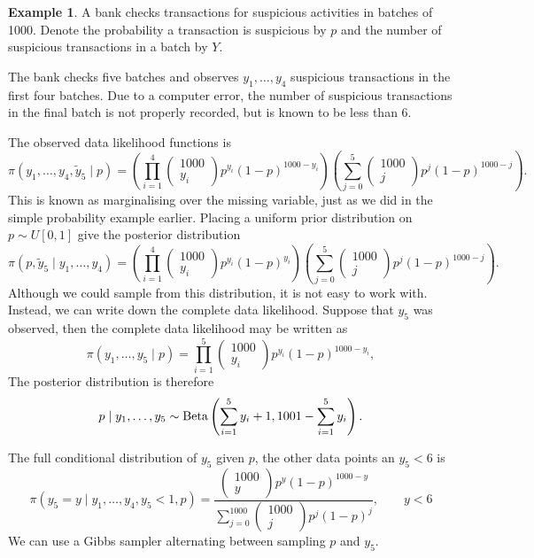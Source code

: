 \documentclass[
]{book}
\theoremstyle{definition}
\theoremstyle{definition}
\newtheorem{example}{Example}[chapter]
\theoremstyle{definition}
\theoremstyle{definition}
\theoremstyle{remark}
\begin{document}
\begin{example}
A bank checks transactions for suspicious activities in batches of 1000. Denote the probability a transaction is suspicious by \(p\) and the number of suspicious transactions in a batch by \(Y\).

The bank checks five batches and observes \(y_1, \ldots, y_4\) suspicious transactions in the first four batches. Due to a computer error, the number of suspicious transactions in the final batch is not properly recorded, but is known to be less than 6.

The observed data likelihood functions is
\[
\pi(y_1, \ldots, y_4, \tilde{y}_5 \mid p) = \left(\prod_{i=1}^4\begin{pmatrix} 1000 \\ y_i \end{pmatrix} p^{y_i}(1-p)^{1000 - y_i} \right)\left(\sum_{j=0}^5\begin{pmatrix} 1000 \\ j \end{pmatrix} p^{j}(1-p)^{1000 - j}\right).
\]
This is known as marginalising over the missing variable, just as we did in the simple probability example earlier. Placing a uniform prior distribution on \(p \sim U[0, 1]\) give the posterior distribution
\[
\pi(p, \tilde{y}_5 \mid y_1, \ldots, y_4)= \left(\prod_{i=1}^4\begin{pmatrix} 1000 \\ y_i \end{pmatrix} p^{y_i}(1-p)^{y_i} \right)\left(\sum_{j=0}^5\begin{pmatrix} 1000 \\ j \end{pmatrix} p^{j}(1-p)^{1000 - j}\right).
\]
Although we could sample from this distribution, it is not easy to work with. Instead, we can write down the complete data likelihood. Suppose that \(y_5\) was observed, then the complete data likelihood may be written as
\[
\pi(y_1, \ldots, y_5 \mid p)  = \prod_{i=1}^5\begin{pmatrix} 1000 \\ y_i \end{pmatrix} p^{y_i}(1-p)^{1000 - y_i},
\]
The posterior distribution is therefore
\[
p \mid y_1, \ldots, y_5 \sim \hbox{Beta}\left(\sum_{i=1}^5 y_i + 1, 1001 - \sum_{i=1}^5 y_i\right).
\]

The full conditional distribution of \(y_5\) given \(p\), the other data points an \(y_5 < 6\) is
\[
  \pi(y_5 = y \mid y_1, \ldots, y_4, y_5 < 1, p) = \frac{\begin{pmatrix} 1000 \\ y \end{pmatrix} p^{y}(1-p)^{1000 - y}}{\sum_{j=0}^{1000}\begin{pmatrix} 1000 \\ j \end{pmatrix} p^{j}(1-p)^{j}}, \qquad y < 6
\]
We can use a Gibbs sampler alternating between sampling \(p\) and \(y_5\).
\end{example}
\end{document}
